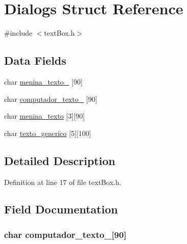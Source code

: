 \hypertarget{struct_dialogs}{\section{Dialogs Struct Reference}
\label{struct_dialogs}
}


{\ttfamily \#include $<$text\-Box.\-h$>$}

\subsection*{Data Fields}
\begin{DoxyCompactItemize}
\item 
char \hyperlink{struct_dialogs_a56690f345b5154a05e69cc41cc83fc8d}{menina\-\_\-texto\-\_} \mbox{[}90\mbox{]}
\item 
char \hyperlink{struct_dialogs_abce8e596cef484ca85aba274579fffe8}{computador\-\_\-texto\-\_} \mbox{[}90\mbox{]}
\item 
char \hyperlink{struct_dialogs_ad1139eea3566e97a5846f5a2541b3159}{menina\-\_\-texto} \mbox{[}3\mbox{]}\mbox{[}90\mbox{]}
\item 
char \hyperlink{struct_dialogs_a13184610041551aa0928d6144c5a1e42}{texto\-\_\-generico} \mbox{[}5\mbox{]}\mbox{[}100\mbox{]}
\end{DoxyCompactItemize}


\subsection{Detailed Description}


Definition at line 17 of file text\-Box.\-h.



\subsection{Field Documentation}
\hypertarget{struct_dialogs_abce8e596cef484ca85aba274579fffe8}{
\subsubsection[{computador\-\_\-texto\-\_\-1}]{\setlength{\rightskip}{0pt plus 5cm}char computador\-\_\-texto\-\_\mbox{[}90\mbox{]}}}\label{struct_dialogs_abce8e596cef484ca85aba274579fffe8}


